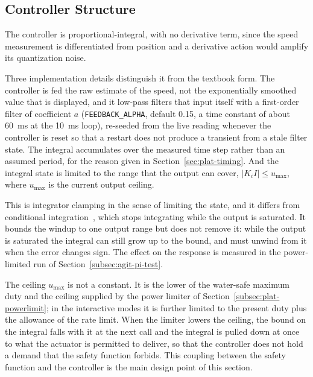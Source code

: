 \subsection{Controller Structure}
\label{subsec:agit-pi-structure}

The controller is proportional-integral, with no derivative term, since the speed measurement is differentiated from position and a derivative action would amplify its quantization noise.

Three implementation details distinguish it from the textbook form. The controller is fed the raw estimate of the speed, not the exponentially smoothed value that is displayed, and it low-pass filters that input itself with a first-order filter of coefficient $a$ (\texttt{FEEDBACK\_ALPHA}, default 0.15, a time constant of about 60~ms at the 10~ms loop), re-seeded from the live reading whenever the controller is reset so that a restart does not produce a transient from a stale filter state. The integral accumulates over the measured time step rather than an assumed period, for the reason given in Section~\ref{sec:plat-timing}. And the integral state is limited to the range that the output can cover, $|K_i I| \leq u_{\max}$, where $u_{\max}$ is the current output ceiling.

This is integrator clamping in the sense of limiting the state, and it differs from conditional integration~\citep{bohn1995}, which stops integrating while the output is saturated. It bounds the windup to one output range but does not remove it: while the output is saturated the integral can still grow up to the bound, and must unwind from it when the error changes sign. The effect on the response is measured in the power-limited run of Section~\ref{subsec:agit-pi-test}.

The ceiling $u_{\max}$ is not a constant. It is the lower of the water-safe maximum duty and the ceiling supplied by the power limiter of Section~\ref{subsec:plat-powerlimit}; in the interactive modes it is further limited to the present duty plus the allowance of the rate limit. When the limiter lowers the ceiling, the bound on the integral falls with it at the next call and the integral is pulled down at once to what the actuator is permitted to deliver, so that the controller does not hold a demand that the safety function forbids. This coupling between the safety function and the controller is the main design point of this section.

